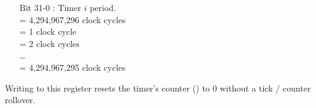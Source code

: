 \vspace{-2mm}
\begin{itemize}[leftmargin=18mm,labelsep=3mm,parsep=1.5mm]
    \item[\footnotesize Bit 31-0] : Timer $i$ period.\\{\footnotesize
     = 4,294,967,296 clock cycles\\
     = 1 clock cycle\\
     = 2 clock cycles\\
    \ldots\\
     = 4,294,967,295 clock cycles}
\end{itemize}
Writing to this register resets the timer's counter () to 0 without a tick / counter rollover.

